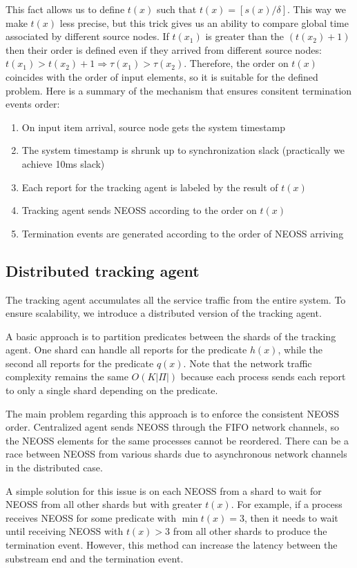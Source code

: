 This fact allows us to define $t(x)$ such that $t(x) = [s(x) / \delta]$. This way we make $t(x)$ less precise, but this trick gives us an ability to compare global time associated by different source nodes. If $t(x_1)$ is greater than the $(t(x_2) + 1)$ then their order is defined even if they arrived from different source nodes:  $t(x_1) > t(x_2) + 1 \Rightarrow \tau(x_1) > \tau(x_2)$. Therefore, the order on $t(x)$ coincides with the order of input elements, so it is suitable for the defined problem. Here is a summary of the mechanism that ensures consitent termination events order:
\begin{enumerate}
    \item On input item arrival, source node gets the system timestamp
    \item The system timestamp is shrunk up to synchronization slack (practically we achieve 10ms slack)
    \item Each report for the tracking agent is labeled by the result of $t(x)$
    \item Tracking agent sends NEOSS according to the order on $t(x)$
    \item Termination events are generated according to the order of NEOSS arriving
\end{enumerate}

\subsection{Distributed tracking agent}

The tracking agent accumulates all the service traffic from the entire system. To ensure scalability, we introduce a distributed version of the tracking agent.

A basic approach is to partition predicates between the shards of the tracking agent. One shard can handle all reports for the predicate $h(x)$, while the second all reports for the predicate $q(x)$. Note that the network traffic complexity remains the same $O(K|\Pi|)$ because each process sends each report to only a single shard depending on the predicate.

The main problem regarding this approach is to enforce the consistent NEOSS order. Centralized agent sends NEOSS through the FIFO network channels, so the NEOSS elements for the same processes cannot be reordered. There can be a race between NEOSS from various shards due to asynchronous network channels in the distributed case.

A simple solution for this issue is on each NEOSS from a shard to wait for NEOSS from all other shards but with greater $t(x)$. For example, if a process receives NEOSS for some predicate with $\min t(x) = 3$, then it needs to wait until receiving NEOSS with $t(x) > 3$ from all other shards to produce the termination event. However, this method can increase the latency between the substream end and the termination event.

